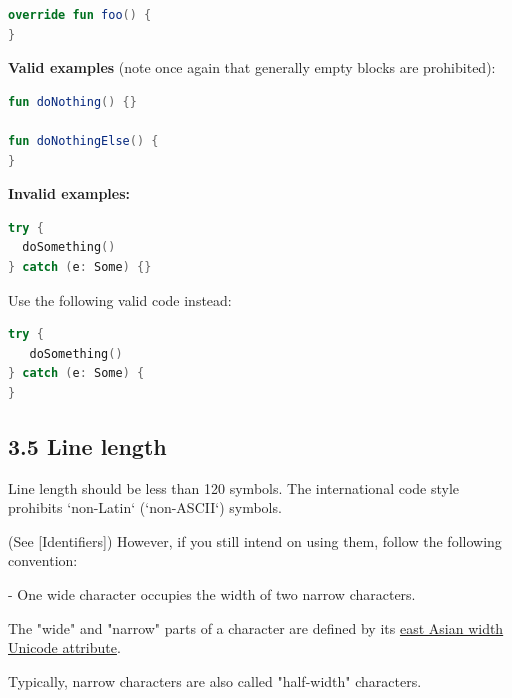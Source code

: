 \begin{lstlisting}[language=Kotlin]
override fun foo() {    
}
\end{lstlisting}


\textbf{Valid examples} (note once again that generally empty blocks are prohibited):



\begin{lstlisting}[language=Kotlin]
fun doNothing() {} 

fun doNothingElse() {
}
\end{lstlisting}


\textbf{Invalid examples:}

\begin{lstlisting}[language=Kotlin]
try {
  doSomething()
} catch (e: Some) {}
\end{lstlisting}


Use the following valid code instead:

\begin{lstlisting}[language=Kotlin]
try {
   doSomething()
} catch (e: Some) {
}
\end{lstlisting}


\subsection*{\textbf{3.5 Line length}}



Line length should be less than 120 symbols. The international code style prohibits `non-Latin` (`non-ASCII`) symbols.

(See [Identifiers]) However, if you still intend on using them, follow the following convention:



- One wide character occupies the width of two narrow characters.

The "wide" and "narrow" parts of a character are defined by its \href{https://unicode.org/reports/tr11/}{east Asian width Unicode attribute}.

Typically, narrow characters are also called "half-width" characters.

